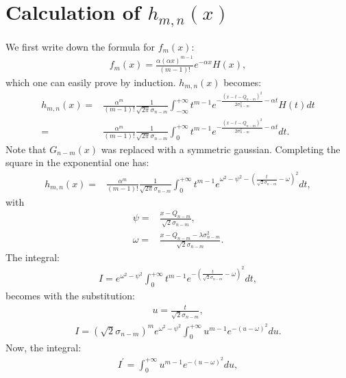 \documentclass[preprint,12pt]{elsarticle}
\begin{document}
\section{Calculation of $h_{m,n}(x)$}
\label{app:Imn}
%

We first write down the formula for $f_m(x)$:
\begin{align}
f_m(x) =  \frac{\alpha (\alpha x )^{m-1}}{(m-1)!} e^{-\alpha x } H(x),
\end{align}
which one can easily prove by induction. 
$h_{m,n}(x)$ becomes:
\begin{align}
h_{m,n}(x) = & \frac{ \alpha^{m}}{(m-1)!} \frac{1}{\sqrt{2\pi}\sigma_{n-m}} \int_{-\infty}^{+\infty} t^{m-1} e^{ -\frac{ (x-t -Q_{n-m})^2}{2\sigma^2_{n-m}}-\alpha t} H(t) dt \nonumber \\
                  = & \frac{ \alpha^{m}}{(m-1)!} \frac{1}{\sqrt{2\pi}\sigma_{n-m}} \int_{0}^{+\infty} t^{m-1} e^{ -\frac{ (x-t -Q_{n-m})^2}{2\sigma^2_{n-m}}-\alpha t} dt.
\end{align}
Note that $G_{n-m}(x)$ was replaced with a symmetric gaussian. 
Completing the square in the exponential one has:
\begin{align}
h_{m,n}(x) = & \frac{ \alpha^{m}}{(m-1)!} \frac{1}{\sqrt{2\pi}\sigma_{n-m}} \int_{0}^{+\infty} t^{m-1} e^{  \omega^2  -\psi^2  -\left( \frac{t}{\sqrt{2}\sigma_{n-m}} - \omega \right)^2} dt,
\end{align}
with 
\begin{align}
\psi = & \frac{x-Q_{n-m}}{\sqrt{2}\sigma_{n-m}}, \\
\omega = & \frac{x-Q_{n-m} -\lambda\sigma^2_{n-m}}{\sqrt{2}\sigma_{n-m}}.
\end{align}  
The integral:
\begin{align}
I =  e^{  \omega^2  -\psi^2 }\int_{0}^{+\infty} t^{m-1} e^{  -\left( \frac{t}{\sqrt{2}\sigma_{n-m}} - \omega \right)^2} dt,
\end{align}
becomes with the substitution:
\begin{align}
u = \frac{t}{\sqrt{2}\sigma_{n-m}},
\end{align}
\begin{align}
I =  (\sqrt{2}\sigma_{n-m})^m e^{  \omega^2  -\psi^2 }\int_{0}^{+\infty} u^{m-1} e^{  -\left( u - \omega \right)^2} du.
\end{align}
Now, the integral:
\begin{align}
I^\prime = \int_{0}^{+\infty} u^{m-1} e^{  -\left( u - \omega \right)^2} du,
\end{align}
\end{document}
